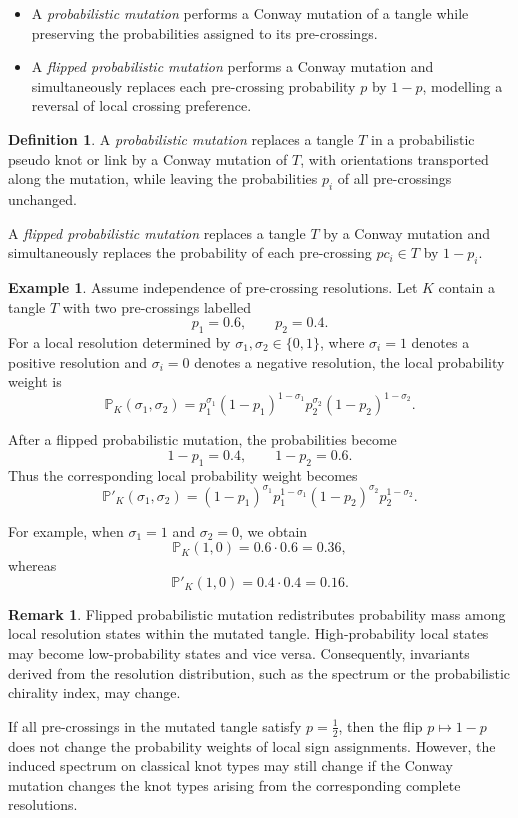 \documentclass[a4paper, reqno, 12pt]{amsart}
\theoremstyle{plain}
\theoremstyle{definition}
\newtheorem{definition}[theorem]{Definition}
\newtheorem{example}[theorem]{Example}
\newtheorem{remark}[theorem]{Remark}
\begin{document}
\begin{itemize}
\item[-] A \emph{probabilistic mutation} performs a Conway mutation of a tangle while preserving the probabilities assigned to its pre-crossings.

\item[-] A \emph{flipped probabilistic mutation} performs a Conway mutation and simultaneously replaces each pre-crossing probability \(p\) by \(1-p\), modelling a reversal of local crossing preference.
\end{itemize}

\begin{definition}\rm
A \emph{probabilistic mutation} replaces a tangle \(T\) in a probabilistic pseudo knot or link by a Conway mutation of \(T\), with orientations transported along the mutation, while leaving the probabilities \(p_i\) of all pre-crossings unchanged.

A \emph{flipped probabilistic mutation} replaces a tangle \(T\) by a Conway mutation and simultaneously replaces the probability of each pre-crossing \(pc_i\in T\) by \(1-p_i\).
\end{definition}

\begin{example}\rm
Assume independence of pre-crossing resolutions. Let \(K\) contain a tangle \(T\) with two pre-crossings labelled
\[
p_1=0.6,
\qquad
p_2=0.4.
\]
For a local resolution determined by \(\sigma_1,\sigma_2\in\{0,1\}\), where \(\sigma_i=1\) denotes a positive resolution and \(\sigma_i=0\) denotes a negative resolution, the local probability weight is
\[
\mathbb P_K(\sigma_1,\sigma_2)
=
p_1^{\sigma_1}(1-p_1)^{1-\sigma_1}
p_2^{\sigma_2}(1-p_2)^{1-\sigma_2}.
\]

After a flipped probabilistic mutation, the probabilities become
\[
1-p_1=0.4,
\qquad
1-p_2=0.6.
\]
Thus the corresponding local probability weight becomes
\[
\mathbb P'_K(\sigma_1,\sigma_2)
=
(1-p_1)^{\sigma_1}p_1^{1-\sigma_1}
(1-p_2)^{\sigma_2}p_2^{1-\sigma_2}.
\]

For example, when \(\sigma_1=1\) and \(\sigma_2=0\), we obtain
\[
\mathbb P_K(1,0)
=
0.6\cdot 0.6
=
0.36,
\]
whereas
\[
\mathbb P'_K(1,0)
=
0.4\cdot 0.4
=
0.16.
\]
\end{example}

\begin{remark}\rm
Flipped probabilistic mutation redistributes probability mass among local resolution states within the mutated tangle. High-probability local states may become low-probability states and vice versa. Consequently, invariants derived from the resolution distribution, such as the spectrum or the probabilistic chirality index, may change.

If all pre-crossings in the mutated tangle satisfy \(p=\frac12\), then the flip \(p\mapsto 1-p\) does not change the probability weights of local sign assignments. However, the induced spectrum on classical knot types may still change if the Conway mutation changes the knot types arising from the corresponding complete resolutions.
\end{remark}
\end{document}
